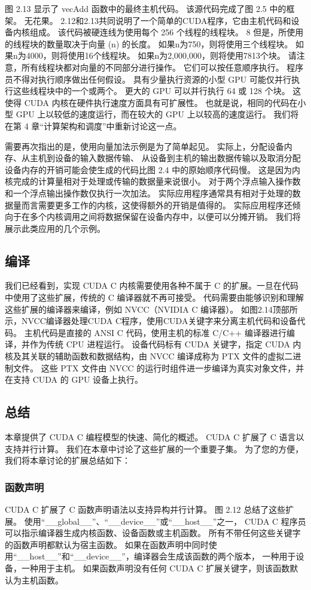 图 2.13 显示了 vecAdd 函数中的最终主机代码。 该源代码完成了图 2.5 中的框架。 无花果。 
2.12和2.13共同说明了一个简单的CUDA程序，它由主机代码和设备内核组成。 该代码被硬连线为使用每个 256 个线程的线程块。 
8 但是，所使用的线程块的数量取决于向量 (n) 的长度。 如果n为750，则将使用三个线程块。 如果n为4000，则将使用16个线程块。 
如果n为2,000,000，则将使用7813个块。 请注意，所有线程块都对向量的不同部分进行操作。 
它们可以按任意顺序执行。 程序员不得对执行顺序做出任何假设。 
具有少量执行资源的小型 GPU 可能仅并行执行这些线程块中的一个或两个。 更大的 GPU 可以并行执行 64 或 128 个块。 
这使得 CUDA 内核在硬件执行速度方面具有可扩展性。 
也就是说，相同的代码在小型 GPU 上以较低的速度运行，而在较大的 GPU 上以较高的速度运行。 
我们将在第 4 章“计算架构和调度”中重新讨论这一点。

需要再次指出的是，使用向量加法示例是为了简单起见。 
实际上，分配设备内存、从主机到设备的输入数据传输、
从设备到主机的输出数据传输以及取消分配设备内存的开销可能会使生成的代码比图 2.4 中的原始顺序代码慢。 
这是因为内核完成的计算量相对于处理或传输的数据量来说很小。 对于两个浮点输入操作数和一个浮点输出操作数仅执行一次加法。 
实际应用程序通常具有相对于处理的数据量而言需要更多工作的内核，这使得额外的开销是值得的。 
实际应用程序还倾向于在多个内核调用之间将数据保留在设备内存中，以便可以分摊开销。 我们将展示此类应用的几个示例。

\subsection{编译}
我们已经看到，实现 CUDA C 内核需要使用各种不属于 C 的扩展。一旦在代码中使用了这些扩展，传统的 C 编译器就不再可接受。 
代码需要由能够识别和理解这些扩展的编译器来编译，例如 NVCC（NVIDIA C 编译器）。 
如图2.14顶部所示，NVCC编译器处理CUDA C程序，使用CUDA关键字来分离主机代码和设备代码。 
主机代码是直接的 ANSI C 代码，使用主机的标准 C/C++ 编译器进行编译，并作为传统 CPU 进程运行。 
设备代码标有 CUDA 关键字，指定 CUDA 内核及其关联的辅助函数和数据结构，由 NVCC 编译成称为 PTX 文件的虚拟二进制文件。 
这些 PTX 文件由 NVCC 的运行时组件进一步编译为真实对象文件，并在支持 CUDA 的 GPU 设备上执行。

\subsection{总结}
本章提供了 CUDA C 编程模型的快速、简化的概述。 CUDA C 扩展了 C 语言以支持并行计算。 
我们在本章中讨论了这些扩展的一个重要子集。 为了您的方便，我们将本章讨论的扩展总结如下：

\subsubsection{函数声明}
CUDA C 扩展了 C 函数声明语法以支持异构并行计算。 图 2.12 总结了这些扩展。 
使用“\_\_global\_\_”、“\_\_device\_\_”或“\_\_host\_\_”之一，
CUDA C 程序员可以指示编译器生成内核函数、设备函数或主机函数。 所有不带任何这些关键字的函数声明都默认为宿主函数。 
如果在函数声明中同时使用“\_\_host\_\_”和“\_\_device\_\_”，编译器会生成该函数的两个版本，
一种用于设备，一种用于主机。 如果函数声明没有任何 CUDA C 扩展关键字，则该函数默认为主机函数。

